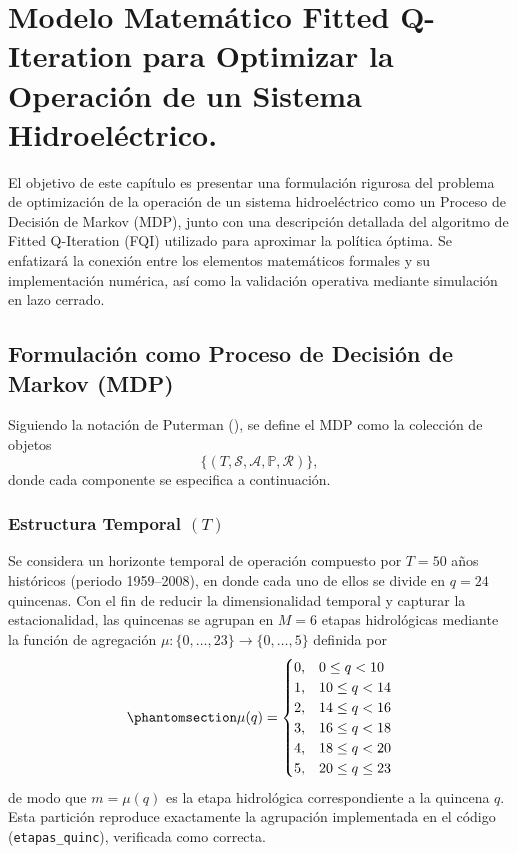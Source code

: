 \documentclass[
  spanish,
  letterpaper,
]{scrreprt}
\theoremstyle{definition}
\theoremstyle{remark}
\begin{document}
\chapter{Modelo Matemático Fitted Q-Iteration para Optimizar la
Operación de un Sistema
Hidroeléctrico.}\label{modelo-matemuxe1tico-fitted-q-iteration-para-optimizar-la-operaciuxf3n-de-un-sistema-hidroeluxe9ctrico.}

El objetivo de este capítulo es presentar una formulación rigurosa del
problema de optimización de la operación de un sistema hidroeléctrico
como un Proceso de Decisión de Markov (MDP), junto con una descripción
detallada del algoritmo de Fitted Q-Iteration (FQI) utilizado para
aproximar la política óptima. Se enfatizará la conexión entre los
elementos matemáticos formales y su implementación numérica, así como la
validación operativa mediante simulación en lazo cerrado.

\section{Formulación como Proceso de Decisión de Markov
(MDP)}\label{formulaciuxf3n-como-proceso-de-decisiuxf3n-de-markov-mdp}

Siguiendo la notación de Puterman
(), se define el MDP como la
colección de objetos
\[\{(T, \mathcal{S}, \mathcal{A}, \mathbb{P}, \mathcal{R})\},\] donde
cada componente se especifica a continuación.

\subsection{\texorpdfstring{Estructura Temporal
\((T)\)}{Estructura Temporal (T)}}\label{estructura-temporal-t}

Se considera un horizonte temporal de operación compuesto por \(T = 50\)
años históricos (periodo 1959--2008), en donde cada uno de ellos se
divide en \(q = 24\) quincenas. Con el fin de reducir la dimensionalidad
temporal y capturar la estacionalidad, las quincenas se agrupan en
\(M = 6\) etapas hidrológicas mediante la función de agregación
\(\mu: \{0,\dots,23\} \to \{0,\dots,5\}\) definida por
\begin{equation}\protect\phantomsection\label{eq-etapas}{\mu(q) = \begin{cases} 0, & 0 \leq q <10\\ 1, & 10 \leq q <14\\ 2, & 14 \leq q < 16\\ 3, & 16 \leq q < 18\\ 4, & 18 \leq q < 20\\ 5, & 20 \leq q \leq 23\\ \end{cases}}\end{equation}
de modo que \(m = \mu(q)\) es la etapa hidrológica correspondiente a la
quincena \(q.\) Esta partición reproduce exactamente la agrupación
implementada en el código (\texttt{etapas\_quinc}), verificada como
correcta.
\end{document}
